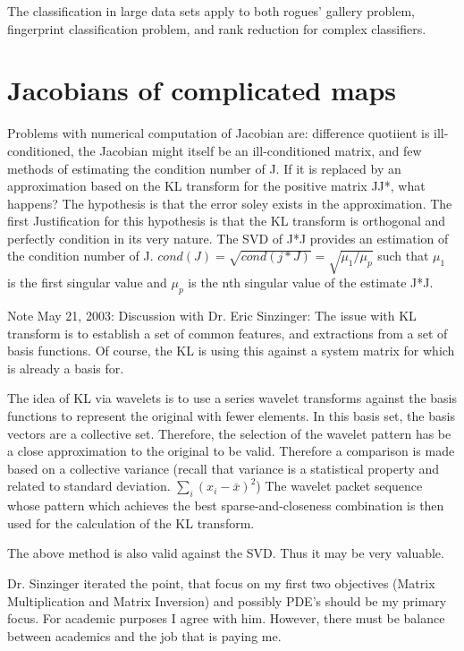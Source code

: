 \documentclass[11pt]{book}
\begin{document}
The classification in large data sets apply to both rogues' gallery problem, fingerprint classification problem, and rank reduction for complex classifiers.  


\chapter {Jacobians of complicated maps}

Problems with numerical computation of Jacobian are: difference quotiient is ill-conditioned, the Jacobian might itself be an ill-conditioned matrix, and few methods of estimating the condition number of J. If it is replaced by an approximation based on the KL transform for the positive matrix JJ*, what happens?  The hypothesis is that the error soley exists in the approximation.  The first Justification for this hypothesis is that the KL transform is orthogonal and perfectly condition in its very nature.  The SVD of J*J provides an estimation of the condition number of J.  $cond(J) =\sqrt{cond(j*J)} = \sqrt{\mu_1/\mu_p}$ such that $\mu_1$ is the first singular value and $\mu_p$ is the nth singular value of the estimate J*J.  

Note May 21, 2003: 
Discussion with Dr. Eric Sinzinger:
The issue with KL transform is to establish a set of common features, and extractions from a set of basis functions.  Of course, the KL is using this against a system matrix for which is already a basis for.  

The idea of KL via wavelets is to use a series wavelet transforms against the basis functions to represent the original with fewer elements.  In this basis set, the basis vectors are a collective set.  Therefore, the selection of the wavelet pattern has be a close approximation to the original to be valid.  Therefore a comparison is made based on a collective variance (recall that variance is a statistical property and related to standard deviation. $\sum_i (x_i -\bar{x})^2$)  The wavelet packet sequence whose pattern which achieves the best sparse-and-closeness combination is then used for the calculation of the KL transform.  

The above method is also valid against the SVD.  Thus it may be very valuable.  

Dr. Sinzinger iterated the point, that focus on my first two objectives (Matrix Multiplication and Matrix Inversion) and possibly PDE's should be my primary focus.  For academic purposes I agree with him.  However, there must be balance between academics and the job that is paying me.  
\end{document}
